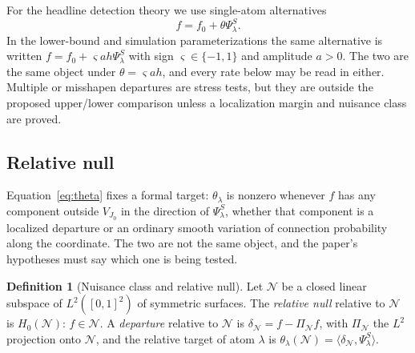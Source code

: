 \documentclass[11pt]{article}
\theoremstyle{definition}
\newtheorem{definition}{Definition}[section]
\newcommand{\1}{\mathbf 1}\newcommand{\op}{\operatorname}
\begin{document}
For the headline detection theory we use single-atom alternatives
\begin{equation}
 f=f_0+\theta\Psi_\lambda^S.                                  \label{eq:alternative}
\end{equation}
In the lower-bound and simulation parameterizations the same alternative is written
$f=f_0+\varsigma ah\Psi_\lambda^S$ with sign $\varsigma\in\{-1,1\}$ and amplitude
$a>0$.  The two are the same object under $\theta=\varsigma ah$, and every rate below
may be read in either.
Multiple or misshapen departures are stress tests, but they are outside the proposed
upper/lower comparison unless a localization margin and nuisance class are proved.

\subsection{Relative null}                                 \label{sec:scinull}

Equation~\eqref{eq:theta} fixes a formal target: $\theta_\lambda$ is nonzero
whenever $f$ has any component outside $V_{J_0}$ in the direction of
$\Psi^S_\lambda$, whether that component is a localized departure or an ordinary
smooth variation of connection probability along the coordinate.  The two are
not the same object, and the paper's hypotheses must say which one
is being tested.

\begin{definition}[Nuisance class and relative null]\label{def:scinull}
Let $\mathcal N$ be a closed linear subspace of $L^2([0,1]^2)$ of symmetric
surfaces.  The \emph{relative null}
relative to $\mathcal N$ is $H_0(\mathcal N)$: $f\in\mathcal N$.  A
\emph{departure} relative to $\mathcal N$ is $\delta_{\mathcal N}=f-\Pi_{\mathcal N}f$,
with $\Pi_{\mathcal N}$ the $L^2$ projection onto $\mathcal N$, and the relative
target of atom $\lambda$ is $\theta_\lambda(\mathcal N)=\langle\delta_{\mathcal N},\Psi^S_\lambda\rangle$.
\end{definition}
\end{document}
